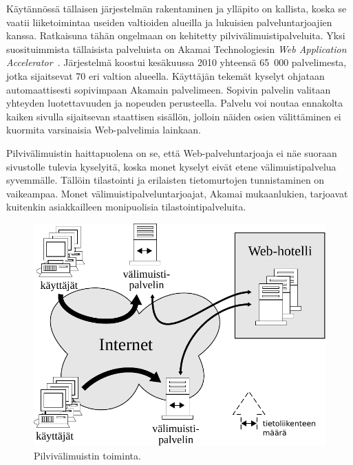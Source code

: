 Käytännössä tällaisen järjestelmän rakentaminen ja ylläpito on
kallista, koska se vaatii liiketoimintaa useiden valtioiden alueilla ja
lukuisien palveluntarjoajien kanssa. Ratkaisuna tähän ongelmaan on kehitetty
pilvivälimuistipalveluita.
Yksi suosituimmista tällaisista palveluista on Akamai Technologiesin
\textit{Web Ap\-plic\-a\-tion Accelerator}~\cite{akamai}. Järjestelmä
koostui kesäkuussa 2010 yhteensä 65~000 palvelimesta, jotka
sijaitsevat 70 eri valtion alueella. Käyttäjän tekemät kyselyt
ohjataan automaattisesti sopivimpaan Akamain palvelimeen. Sopivin
palvelin valitaan yhteyden luotettavuuden ja nopeuden
perusteella. Palvelu voi noutaa ennakolta kaiken sivulla sijaitsevan
staattisen sisällön, jolloin näiden osien välittäminen ei kuormita
varsinaisia Web-palvelimia lainkaan.

Pilvivälimuistin haittapuolena on se, että Web-palveluntarjoaja ei näe
suoraan sivustolle tulevia kyselyitä, koska monet kyselyt eivät etene
välimuistipalvelua syvemmälle. Tällöin tilastointi ja erilaisten tietomurtojen
tunnistaminen on vaikeampaa. Monet välimuistipalveluntarjoajat, Akamai
mukaanlukien, tarjoavat kuitenkin asiakkailleen monipuolisia tilastointipalveluita.

\begin{figure}[htp]
\centering
\includegraphics[width=12cm]{pics/cloudcache.pdf}
\caption{Pilvivälimuistin toiminta.}
\label{cloudcache}
\end{figure}

